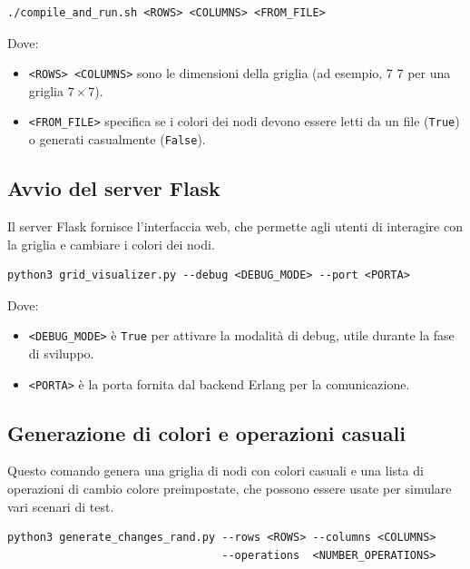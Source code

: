 \documentclass[12pt, a4paper]{report}
\begin{document}
\newpage
\begin{tcolorbox}[title=Comandi di avvio in Erlang]
\begin{verbatim}
./compile_and_run.sh <ROWS> <COLUMNS> <FROM_FILE>
\end{verbatim}
\end{tcolorbox}

\noindent Dove:
\begin{itemize}
\item \texttt{<ROWS> <COLUMNS>} sono le dimensioni della griglia (ad esempio, 7 7 per una griglia $7\times7$).
\item \texttt{<FROM\_FILE>} specifica se i colori dei nodi devono essere letti da un file (\texttt{True}) o generati casualmente (\texttt{False}).
\end{itemize}

\subsection{Avvio del server Flask}
Il server Flask fornisce l’interfaccia web, che permette agli utenti di interagire con la griglia e cambiare i colori dei nodi.

\begin{tcolorbox}[title=Comandi di avvio del server Flask]
\begin{verbatim}
python3 grid_visualizer.py --debug <DEBUG_MODE> --port <PORTA>
\end{verbatim}
\end{tcolorbox}

\noindent Dove:
\begin{itemize}
    \item \texttt{<DEBUG\_MODE>} \`e \texttt{True} per attivare la modalità di debug, utile durante la fase di sviluppo.
    \item \texttt{<PORTA>} \`e la porta fornita dal backend Erlang per la comunicazione.
\end{itemize}

\subsection{Generazione di colori e operazioni casuali}
Questo comando genera una griglia di nodi con colori casuali e una lista di operazioni di cambio colore preimpostate, che possono essere usate per simulare vari scenari di test.

\begin{tcolorbox}[title=Generazione di colori e operazioni casuali]
\begin{verbatim}
python3 generate_changes_rand.py --rows <ROWS> --columns <COLUMNS> 
                                 --operations  <NUMBER_OPERATIONS>
\end{verbatim}
\end{tcolorbox}
\end{document}
